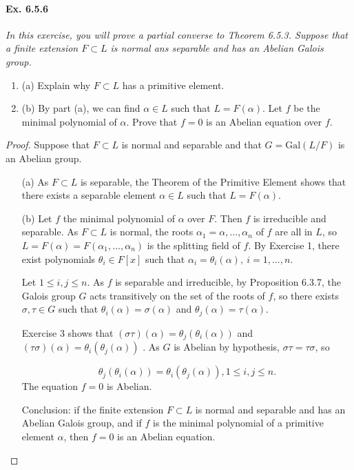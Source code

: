 \documentclass[11pt,a4paper]{article}
\newcommand{\be} {\begin{enumerate}}
\newcommand{\ee} {\end{enumerate}}
\newcommand{\Gal}{\mathrm{Gal}}
\begin{document}
\paragraph{Ex. 6.5.6}

{\it In this exercise, you will prove a partial converse to Theorem 6.5.3. Suppose that a finite extension $F\subset L$ is normal ans separable and has an Abelian Galois group.
\be
\item[(a)] Explain why $F\subset L$ has a primitive element.
\item[(b)] By part (a), we can find $\alpha \in L$ such that $L = F(\alpha)$. Let $f$ be the minimal polynomial of $\alpha$. Prove that $f=0$ is an Abelian equation over $f$.
\ee
}

\begin{proof}
Suppose that $F \subset L$ is normal and separable and that $G = \Gal(L/F)$ is an Abelian group.
\begin{enumerate}
\item[(a)]
As $F \subset L$ is separable, the Theorem of the Primitive Element shows that there exists a separable element $\alpha \in L$ such that $L=F(\alpha)$.

\item[(b)]
Let $f$ the minimal polynomial of $\alpha$ over $F$. Then $f$ is irreducible and separable. As $F \subset L$ is normal, the roots $\alpha_1=\alpha,\ldots,\alpha_n$ of $f$ are all in $L$, so  $L = F(\alpha) = F(\alpha_1,\ldots,\alpha_n)$ is the splitting field of $f$. By Exercise 1, there exist polynomials $\theta_i\in F[x]$ such that $\alpha_i = \theta_i(\alpha),\ i= 1,\ldots,n$.

Let $1\leq i,j \leq n$. As $f$ is separable and irreducible, by Proposition 6.3.7, the Galois group $G$ acts transitively on the set of the roots of $f$, so there exists $\sigma, \tau \in G$ such that $\theta_i(\alpha) = \sigma(\alpha)$ and $\theta_j(\alpha) = \tau(\alpha)$.

Exercise 3 shows that $(\sigma \tau)(\alpha) = \theta_j(\theta_i(\alpha))$ and $(\tau \sigma)(\alpha) = \theta_i(\theta_j(\alpha))$ . As $G$ is Abelian by hypothesis, $\sigma \tau = \tau \sigma$, so

$$ \theta_j(\theta_i(\alpha)) =  \theta_i(\theta_j(\alpha)), 1\leq i,j \leq n.$$
The equation $f=0$ is Abelian.

Conclusion: if the finite extension $F\subset L$ is normal and separable and has an Abelian Galois group, and if $f$ is the minimal polynomial of a primitive element $\alpha$, then $f=0$ is an Abelian equation.
\end{enumerate}
\end{proof}
\end{document}
